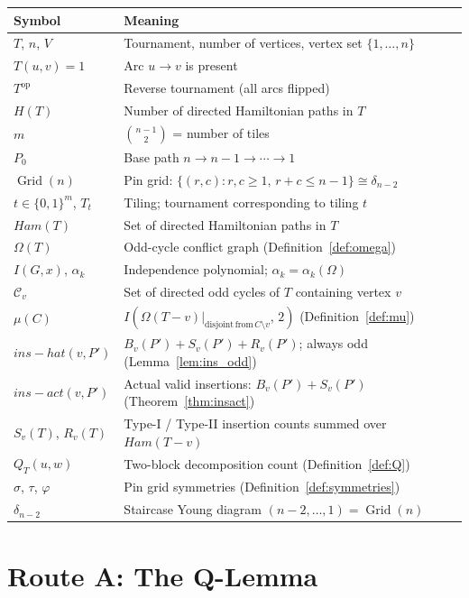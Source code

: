 \documentclass[12pt,reqno]{amsart}
\theoremstyle{plain}
\theoremstyle{definition}
\theoremstyle{remark}
\DeclareMathOperator{\Grid}{Grid}
\newcommand{\Ham}{\mathrm{Ham}}
\newcommand{\op}{\mathrm{op}}
\newcommand{\inshat}{\widehat{\mathrm{ins}}}
\newcommand{\insact}{\mathrm{ins}_{\mathrm{act}}}
\renewcommand{\Ham}{Ham}%
\renewcommand{\inshat}{ins-hat}%
\renewcommand{\insact}{ins-act}%
\begin{document}
\begin{center}
\small\renewcommand{\arraystretch}{1.18}
\begin{tabular}{p{3.4cm} p{9.6cm}}
\toprule
\textbf{Symbol} & \textbf{Meaning}\\
\midrule
$T$, $n$, $V$ & Tournament, number of vertices, vertex set $\{1,\ldots,n\}$\\
$T(u,v)=1$ & Arc $u\to v$ is present\\
$T^{\op}$ & Reverse tournament (all arcs flipped)\\
$H(T)$ & Number of directed Hamiltonian paths in $T$\\
$m$ & $\binom{n-1}{2}$ = number of tiles\\
$P_0$ & Base path $n\to n-1\to\cdots\to 1$\\
$\Grid(n)$ & Pin grid: $\{(r,c): r,c\ge1,\,r+c\le n-1\}\cong\delta_{n-2}$\\
$t\in\{0,1\}^m$, $T_t$ & Tiling; tournament corresponding to tiling $t$\\
$\Ham(T)$ & Set of directed Hamiltonian paths in $T$\\
$\Omega(T)$ & Odd-cycle conflict graph (Definition~\ref{def:omega})\\
$I(G,x)$, $\alpha_k$ & Independence polynomial; $\alpha_k=\alpha_k(\Omega)$\\
$\mathcal{C}_v$ & Set of directed odd cycles of $T$ containing vertex $v$\\
$\mu(C)$ & $I(\Omega(T{-}v)|_{\mathrm{disjoint\,from\,}C\setminus v},\,2)$ (Definition~\ref{def:mu})\\
$\inshat(v,P')$ & $B_v(P')+S_v(P')+R_v(P')$; always odd (Lemma~\ref{lem:ins_odd})\\
$\insact(v,P')$ & Actual valid insertions: $B_v(P')+S_v(P')$ (Theorem~\ref{thm:insact})\\
$S_v(T)$, $R_v(T)$ & Type-I / Type-II insertion counts summed over $\Ham(T{-}v)$\\
$Q_T(u,w)$ & Two-block decomposition count (Definition~\ref{def:Q})\\
$\sigma$, $\tau$, $\varphi$ & Pin grid symmetries (Definition~\ref{def:symmetries})\\
$\delta_{n-2}$ & Staircase Young diagram $(n{-}2,\ldots,1)=\Grid(n)$\\
\bottomrule
\end{tabular}
\end{center}

\section{Route A: The Q-Lemma}
\label{sec:routeA}
\end{document}
